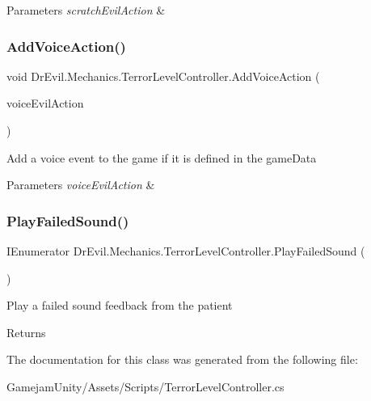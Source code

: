 \begin{DoxyParams}{Parameters}
{\em scratch\+Evil\+Action} & \\
\hline
\end{DoxyParams}
\mbox{\label{class_dr_evil_1_1_mechanics_1_1_terror_level_controller_a4c48f71b3f4881fd082d2a823aa19464}} 
\subsubsection{\texorpdfstring{Add\+Voice\+Action()}{AddVoiceAction()}}
{\footnotesize\ttfamily void Dr\+Evil.\+Mechanics.\+Terror\+Level\+Controller.\+Add\+Voice\+Action (\begin{DoxyParamCaption}\item[{\mbox{\hyperlink{class_evil_action}{Evil\+Action}}}]{voice\+Evil\+Action }\end{DoxyParamCaption})\hspace{0.3cm}{\ttfamily [inline]}}



Add a voice event to the game if it is defined in the game\+Data 


\begin{DoxyParams}{Parameters}
{\em voice\+Evil\+Action} & \\
\hline
\end{DoxyParams}
\mbox{\label{class_dr_evil_1_1_mechanics_1_1_terror_level_controller_a0ababae78433f3aed00a7a871f3526fc}} 
\subsubsection{\texorpdfstring{Play\+Failed\+Sound()}{PlayFailedSound()}}
{\footnotesize\ttfamily I\+Enumerator Dr\+Evil.\+Mechanics.\+Terror\+Level\+Controller.\+Play\+Failed\+Sound (\begin{DoxyParamCaption}{ }\end{DoxyParamCaption})\hspace{0.3cm}{\ttfamily [inline]}}



Play a failed sound feedback from the patient 

\begin{DoxyReturn}{Returns}

\end{DoxyReturn}


The documentation for this class was generated from the following file\+:\begin{DoxyCompactItemize}
\item 
Gamejam\+Unity/\+Assets/\+Scripts/Terror\+Level\+Controller.\+cs\end{DoxyCompactItemize}
